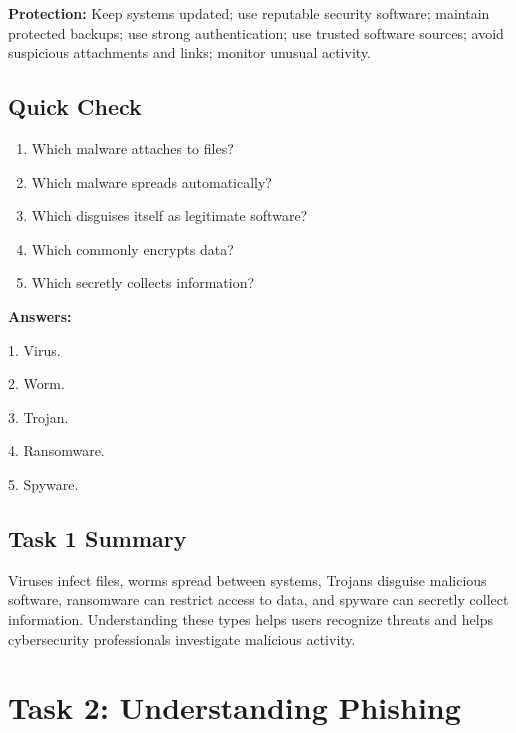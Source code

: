 \documentclass[12pt,a4paper]{article}
\begin{document}
\textbf{Protection:} Keep systems updated; use reputable security software; maintain protected backups; use strong authentication; use trusted software sources; avoid suspicious attachments and links; monitor unusual activity.


\subsection{Quick Check}

\begin{enumerate}
    \item Which malware attaches to files?
    \item Which malware spreads automatically?
    \item Which disguises itself as legitimate software?
    \item Which commonly encrypts data?
    \item Which secretly collects information?
\end{enumerate}

\textbf{Answers:}

1. Virus.

2. Worm.

3. Trojan.

4. Ransomware.

5. Spyware.


\subsection{Task 1 Summary}

Viruses infect files, worms spread between systems, Trojans disguise malicious software, ransomware can restrict access to data, and spyware can secretly collect information. Understanding these types helps users recognize threats and helps cybersecurity professionals investigate malicious activity.


\clearpage

\section{Task 2: Understanding Phishing}
\end{document}
